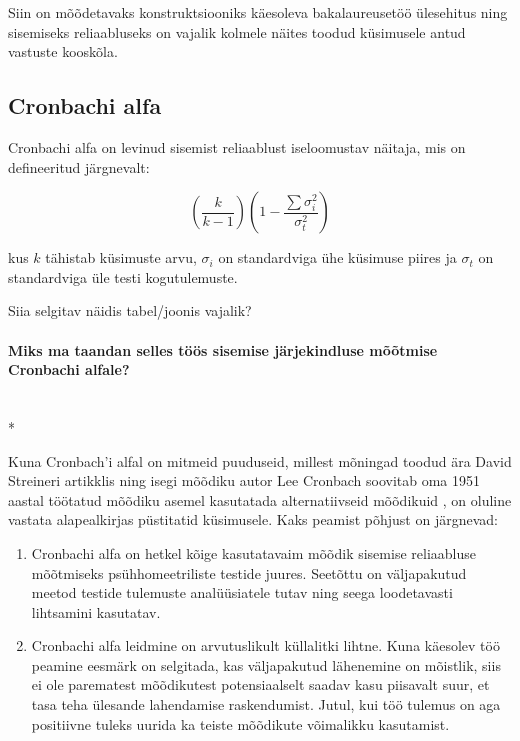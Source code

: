 \documentclass[a4paper]{article}
\begin{document}
Siin on mõõdetavaks konstruktsiooniks käesoleva bakalaureusetöö \"ulesehitus ning sisemiseks reliaabluseks on vajalik kolmele näites toodud k\"usimusele antud vastuste kooskõla.



\subsection{Cronbachi alfa}

Cronbachi alfa on levinud sisemist reliaablust iseloomustav näitaja, mis on defineeritud järgnevalt:

\begin{equation}
(\frac{k}{k-1})( 1 - \frac{\sum \sigma_i^2}{\sigma_t^2})
\end{equation}

kus $k$ tähistab k\"usimuste arvu, $\sigma_i$ on standardviga \"uhe k\"usimuse piires ja $\sigma_t$ on standardviga \"ule testi kogutulemuste.\cite[396]{Cronbach2004}

{\color{cyan} Siia selgitav näidis tabel/joonis vajalik?}


\paragraph{Miks ma taandan selles töös sisemise järjekindluse mõõtmise Cronbachi alfale?}\mbox{}\\*

Kuna Cronbach'i alfal on mitmeid puuduseid, millest mõningad toodud ära David Streineri artikklis \cite[101-102]{Streiner2010} ning isegi mõõdiku autor Lee Cronbach soovitab oma 1951 aastal töötatud mõõdiku asemel kasutatada alternatiivseid mõõdikuid \cite{Cronbach2004}, on oluline vastata alapealkirjas p\"ustitatid k\"usimusele. Kaks peamist põhjust on järgnevad:
\begin{enumerate}[I]
\item Cronbachi alfa on hetkel kõige kasutatavaim mõõdik sisemise reliaabluse mõõtmiseks ps\"uhhomeetriliste testide juures. Seetõttu on väljapakutud meetod testide tulemuste anal\"u\"usiatele tutav ning seega loodetavasti lihtsamini kasutatav.
\item Cronbachi alfa leidmine on arvutuslikult k\"ullalitki lihtne. Kuna käesolev töö peamine eesmärk on selgitada, kas väljapakutud lähenemine on mõistlik, siis ei ole parematest mõõdikutest potensiaalselt saadav kasu piisavalt suur, et tasa teha \"ulesande lahendamise raskendumist. Jutul, kui töö tulemus on aga positiivne tuleks  uurida ka teiste mõõdikute võimalikku kasutamist.

\end{enumerate}
\end{document}
